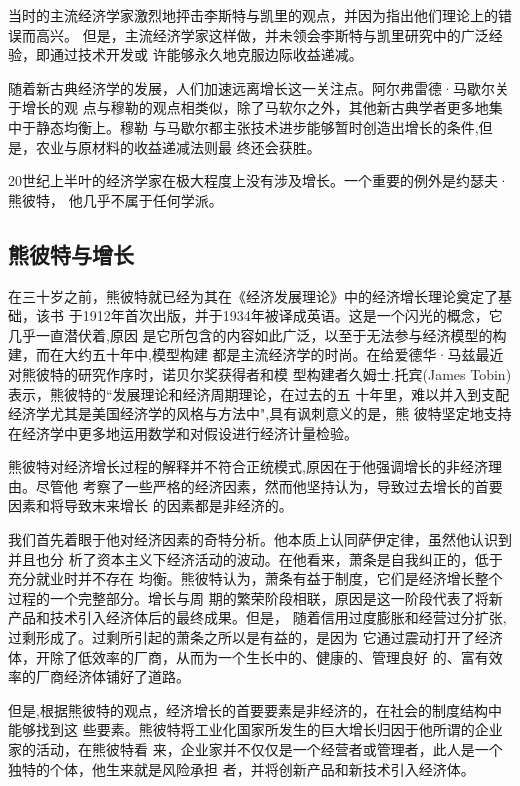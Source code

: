 当时的主流经济学家激烈地抨击李斯特与凯里的观点，并因为指出他们理论上的错误而高兴。
但是，主流经济学家这样做，并未领会李斯特与凯里研究中的广泛经验，即通过技术开发或
许能够永久地克服边际收益递减。

随着新古典经济学的发展，人们加速远离增长这一关注点。阿尔弗雷德·马歇尔关于增长的观
点与穆勒的观点相类似，除了马软尔之外，其他新古典学者更多地集中于静态均衡上。穆勒
与马歇尔都主张技术进步能够暂时创造出增长的条件,但是，农业与原材料的收益递减法则最
终还会获胜。

20世纪上半叶的经济学家在极大程度上没有涉及增长。一个重要的例外是约瑟夫·熊彼特，
他几乎不属于任何学派。

\subsection{熊彼特与增长}

在三十岁之前，熊彼特就已经为其在《经济发展理论》中的经济增长理论奠定了基础，该书
于1912年首次出版，并于1934年被译成英语。这是一个闪光的概念，它几乎一直潜伏着,原因
是它所包含的内容如此广泛，以至于无法参与经济模型的构建，而在大约五十年中,模型构建
都是主流经济学的时尚。在给爱德华·马兹最近对熊彼特的研究作序时，诺贝尔奖获得者和模
型构建者久姆士.托宾(James Tobin)表示，熊彼特的“发展理论和经济周期理论，在过去的五
十年里，难以并入到支配经济学尤其是美国经济学的风格与方法中",具有讽刺意义的是，熊
彼特坚定地支持在经济学中更多地运用数学和对假设进行经济计量检验。

熊彼特对经济增长过程的解释并不符合正统模式,原因在于他强调增长的非经济理由。尽管他
考察了一些严格的经济因素，然而他坚持认为，导致过去增长的首要因素和将导致末来增长
的因素都是非经济的。

我们首先着眼于他对经济因素的奇特分析。他本质上认同萨伊定律，虽然他认识到并且也分
析了资本主义下经济活动的波动。在他看来，萧条是自我纠正的，低于充分就业时并不存在
均衡。熊彼特认为，萧条有益于制度，它们是经济增长整个过程的一个完整部分。增长与周
期的繁荣阶段相联，原因是这一阶段代表了将新产品和技术引入经济体后的最终成果。但是，
随着信用过度膨胀和经营过分扩张,过剩形成了。过剩所引起的萧条之所以是有益的，是因为
它通过震动打开了经济体，开除了低效率的厂商，从而为一个生长中的、健康的、管理良好
的、富有效率的厂商经济体铺好了道路。

但是,根据熊彼特的观点，经济增长的首要要素是非经济的，在社会的制度结构中能够找到这
些要素。熊彼特将工业化国家所发生的巨大增长归因于他所谓的企业家的活动，在熊彼特看
来，企业家并不仅仅是一个经营者或管理者，此人是一个独特的个体，他生来就是风险承担
者，并将创新产品和新技术引入经济体。

